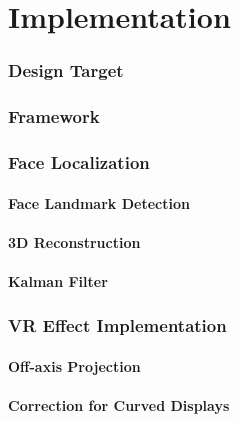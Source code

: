 \part{Implementation}
\section{Design Target}
\section{Framework}
\section{Face Localization}
\subsection{Face  Landmark Detection}
\subsection{3D Reconstruction}
\subsection{Kalman Filter}
\section{VR Effect Implementation}
\subsection{Off-axis Projection}
\subsection{Correction for Curved Displays}